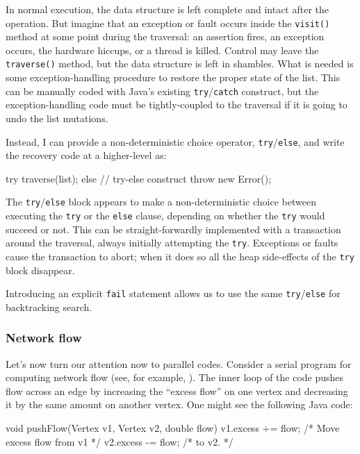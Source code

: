 In normal execution, the data structure is left complete and intact
after the operation.  But
imagine that an exception or fault occurs inside the {\tt visit()} method
at some point during the traversal: an assertion fires, an exception
occurs, the hardware hiccups, or a thread is killed.  Control may
leave the {\tt traverse()} method, but the data structure is left in
shambles.  What is needed is some exception-handling procedure to
restore the proper state of the list.  This can be manually coded with
Java's existing {\tt try}/{\tt catch} construct, but the
exception-handling code must be tightly-coupled to the traversal if it
is going to undo the list mutations.

Instead, I can provide a non-deterministic choice operator,
{\tt try}/{\tt else}, and write the recovery code at a higher-level as:
\begin{inlinecode}
try {
  traverse(list);
} else { // try-else construct
  throw new Error();
}
\end{inlinecode}

The {\tt try}/{\tt else} block appears to make a non-deterministic
choice between executing the {\tt try} or the {\tt else} clause,
depending on whether the {\tt try} would succeed or not.
This can be straight-forwardly implemented
with a transaction around the traversal,
always initially attempting
the {\tt try}.  Exceptions or faults cause the transaction to abort;
when it does so all the
heap side-effects of the {\tt try} block disappear.

Introducing an explicit {\tt fail} statement allows us to use the same
{\tt try}/{\tt else} for backtracking search.

\subsubsection{Network flow}\label{sec:flow}

Let's now turn our attention now to parallel codes.
Consider a serial program for computing network flow (see, for
example, \cite[Chapter 26]{CormenLeRi01}).  The inner loop of the code
pushes flow across an edge by increasing the ``excess flow'' on one
vertex and decreasing it by the same amount on another vertex.  One
might see the following Java code:
\begin{inlinecode}
void pushFlow(Vertex v1, Vertex v2, double flow) {
  v1.excess += flow; /* Move excess flow from v1 */
  v2.excess -= flow; /* to v2.                   */
}
\end{inlinecode}

